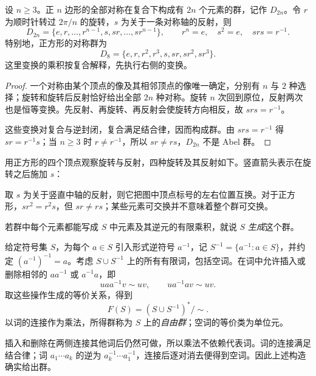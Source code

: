 \documentclass[lang=cn,a4paper,fontset=none,zihao=false,10pt,openany,twoside]{beautybook}
\numberwithin{algorithm}{chapter}
\begin{document}
\begin{example}[正多边形的对称]
设 $n\ge3$。正 $n$ 边形的全部对称在复合下构成有 $2n$ 个元素的群，记作 $D_{2n}$。令 $r$ 为顺时针转过 $2\pi/n$ 的旋转，$s$ 为关于一条对称轴的反射，则
\[
 D_{2n}=\{e,r,\ldots,r^{n-1},s,sr,\ldots,sr^{n-1}\},
 \qquad r^n=e,\quad s^2=e,\quad srs=r^{-1}.
\]
特别地，正方形的对称群为
\[
 D_8=\{e,r,r^2,r^3,s,sr,sr^2,sr^3\}.
\]
这里变换的乘积按复合解释，先执行右侧的变换。
\end{example}
\begin{proof}
一个对称由某个顶点的像及其相邻顶点的像唯一确定，分别有 $n$ 与 $2$ 种选择；旋转和旋转后反射恰好给出全部 $2n$ 种对称。旋转 $n$ 次回到原位，反射两次也是恒等变换。先反射、再旋转、再反射会使旋转方向相反，故 $srs=r^{-1}$。

这些变换对复合与逆封闭，复合满足结合律，因而构成群。由 $srs=r^{-1}$ 得 $sr=r^{-1}s$；当 $n\ge3$ 时 $r\ne r^{-1}$，所以 $sr\ne rs$，$D_{2n}$ 不是 Abel 群。
\end{proof}
用正方形的四个顶点观察旋转与反射，四种旋转及其反射如下。竖直箭头表示在旋转之后施加 $s$：
\begin{center}
\end{center}
取 $s$ 为关于竖直中轴的反射，则它把图中顶点标号的左右位置互换。对于正方形，$sr^2=r^2s$，但 $sr\ne rs$；某些元素可交换并不意味着整个群可交换。

\begin{definition}[生成元与自由群]
若群中每个元素都能写成 $S$ 中元素及其逆元的有限乘积，就说 $S$ \emph{生成}这个群。

给定符号集 $S$，为每个 $a\in S$ 引入形式逆符号 $a^{-1}$，记 $S^{-1}=\{a^{-1}:a\in S\}$，并约定 $(a^{-1})^{-1}=a$。考虑 $S\cup S^{-1}$ 上的所有有限词，包括空词。在词中允许插入或删除相邻的 $aa^{-1}$ 或 $a^{-1}a$，即
\[
 uaa^{-1}v\sim uv,\qquad ua^{-1}av\sim uv.
\]
取这些操作生成的等价关系，得到
\[
 F(S)=(S\cup S^{-1})^*/\!\sim.
\]
以词的连接作为乘法，所得群称为 $S$ 上的\emph{自由群}；空词的等价类为单位元。
\end{definition}
插入和删除在两侧连接其他词后仍然可做，所以乘法不依赖代表词。词的连接满足结合律；词 $a_1\cdots a_k$ 的逆为 $a_k^{-1}\cdots a_1^{-1}$，连接后逐对消去便得到空词。因此上述构造确实给出群。
\end{document}
